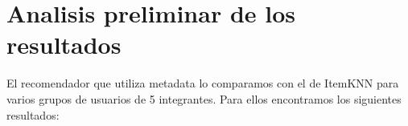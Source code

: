 \documentclass[11pt]{article}
\begin{document}
\section{Analisis preliminar de los resultados}
El recomendador que utiliza metadata lo comparamos con el de ItemKNN para varios grupos de usuarios de 5 integrantes. Para ellos encontramos los siguientes resultados:

\end{document}
